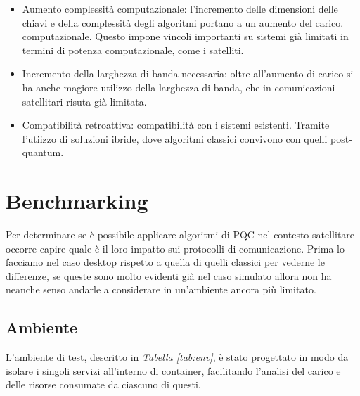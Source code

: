 \begin{itemize}
    \item  Aumento complessità computazionale: l'incremento delle dimensioni delle chiavi e della complessità degli algoritmi portano a un aumento del carico.
    computazionale. Questo impone vincoli importanti su sistemi già limitati in termini di potenza computazionale, come i satelliti. 
    \item Incremento della larghezza di banda necessaria: oltre all'aumento di carico si ha anche magiore utilizzo della larghezza di banda, che in comunicazioni satellitari risuta già limitata.
    \item Compatibilità retroattiva: compatibilità con i sistemi esistenti. Tramite l'utiizzo di soluzioni ibride, dove algoritmi classici convivono con quelli post-quantum.
\end{itemize}

\section{Benchmarking}

Per determinare se è possibile applicare algoritmi di PQC nel contesto satel\-litare occorre capire quale è il loro impatto sui protocolli di comunicazione.
Prima lo facciamo nel caso desktop rispetto a quella di quelli classici per 
vederne le differenze, se queste sono molto evidenti già nel caso simulato allora non ha neanche senso andarle a considerare in un'ambiente
ancora più limitato.

\subsection{Ambiente}

L'ambiente di test, descritto in \textit{Tabella \ref{tab:env}}, è stato progettato in modo da isolare i singoli servizi all'interno di
container, facilitando l'analisi del carico e delle risorse consumate da ciascuno di questi.


